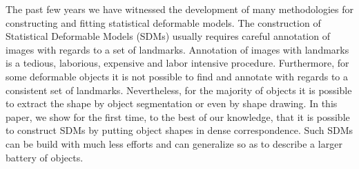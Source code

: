 The past few years we have witnessed the development of many methodologies for constructing and fitting statistical deformable models. The construction of Statistical Deformable Models (SDMs) usually requires careful annotation of images with regards to a set of landmarks. Annotation of images with landmarks is a tedious, laborious, expensive and labor intensive procedure. Furthermore, for some deformable objects it is not possible to find and annotate with regards to a consistent set of landmarks. Nevertheless, for the majority of objects it is possible to extract the shape by object segmentation or even by shape drawing. In this paper, we show for the first time, to the best of our knowledge, that it is possible to construct SDMs by putting object shapes in dense correspondence. Such SDMs can be build with much less efforts and can generalize so as to describe a larger battery of objects.
